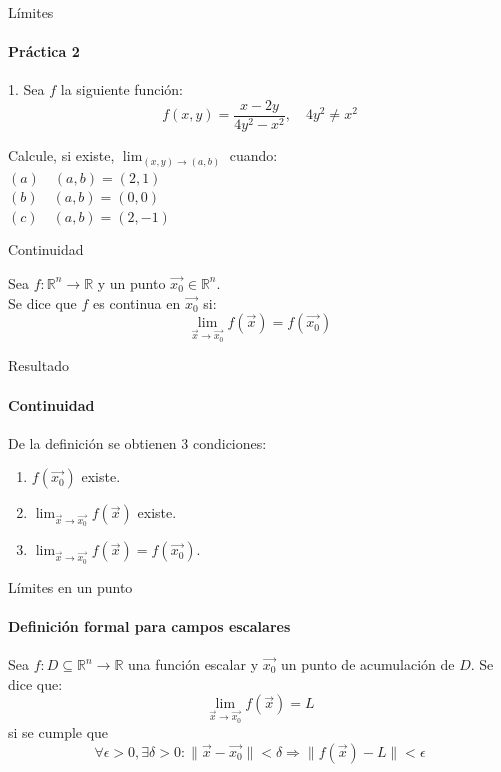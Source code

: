 \documentclass{plantillaPPT}
\begin{document}
\primeraDiapo

\begin{frame}{Límites}
\framesubtitle{Práctica 2}

1. Sea \(f\) la siguiente función:
\[f(x,y)=\frac{x-2y}{4y^2-x^2}, \quad 4y^2\neq x^2\]

Calcule, si existe, \(\displaystyle \lim_{(x,y)\to(a,b)}\) cuando:\\[10 pt]
\((a) \quad (a,b)=(2,1)\)\\
\((b) \quad (a,b)=(0,0)\)\\
\((c) \quad (a,b)=(2,-1)\)

\end{frame}

\begin{frame}{Continuidad}

\begin{definicion}
Sea \(f:\mathbb{R}^n \to \mathbb{R}\) y un punto \(\Vec{x_0}\in\mathbb{R}^n\).\\
Se dice que \(f\) es continua en \(\vec{x_0}\) si:
\[
\lim_{\vec{x}\to\vec{x_0}} f(\vec{x}) = f(\vec{x_0})
\]
\end{definicion}
    
\end{frame}

\begin{frame}{Resultado}
\framesubtitle{Continuidad}

De la definición se obtienen 3 condiciones:

\begin{enumerate}
    \item \(f(\vec{x_0})\) existe.
    \vspace{5pt}
    \item \(\displaystyle \lim_{\vec{x}\to\vec{x_0}}f(\vec{x})\) existe.
    \vspace{5pt}
    \item \(\lim_{\vec{x}\to\vec{x_0}} f(\vec{x}) = f(\vec{x_0})\).
\end{enumerate}

\end{frame}

\begin{frame}{Límites en un punto}
\framesubtitle{Definición formal para campos escalares}

\begin{definicion}
    Sea \(f:D\subseteq\mathbb{R}^n\to\mathbb{R}\) una función escalar y \(\vec{x_0}\) un punto de acumulación de \(D\). Se dice que:
    \[
    \lim_{\vec{x}\to\vec{x_0}}f(\vec{x}) = L
    \]
    si se cumple que
    \[\forall \epsilon>0, \exists \delta>0: \|\vec{x}-\vec{x_0}\|<\delta \Rightarrow \|f(\vec{x})-L\|<\epsilon\]
\end{definicion}

\end{frame}
\end{document}
